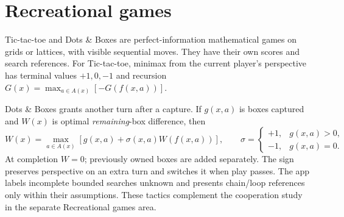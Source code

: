 \documentclass[11pt,a4paper]{article}
\begin{document}
\section{Recreational games}
Tic-tac-toe and Dots \& Boxes are perfect-information mathematical games on
grids or lattices, with visible sequential moves. They have their own scores
and search references. For Tic-tac-toe, minimax from the current player's
perspective has terminal values $+1,0,-1$ and recursion
$G(x)=\max_{a\in A(x)}[-G(f(x,a))]$.

Dots \& Boxes grants another turn after a capture. If $g(x,a)$ is boxes
captured and $W(x)$ is optimal \emph{remaining}-box difference, then
\[
W(x)=\max_{a\in A(x)}[g(x,a)+\sigma(x,a)W(f(x,a))],\qquad
\sigma=\begin{cases}+1,&g(x,a)>0,\\-1,&g(x,a)=0.\end{cases}
\]
At completion $W=0$; previously owned boxes are added separately. The sign
preserves perspective on an extra turn and switches it when play passes.
The app labels incomplete bounded searches unknown and presents chain/loop
references only within their assumptions. These tactics complement the
cooperation study in the separate Recreational games area.
\end{document}
